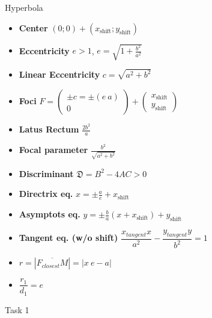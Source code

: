 \documentclass[aspectratio=169]{beamer}
\newcommand{\shf}{\text{shift}}
\begin{document}
\begin{frame}[t]{Hyperbola}
\begin{multicols}{3}
\begin{itemize}
                \item \textbf{Center} $(0;0) + (x_{\shf};y_{\shf})$
                \item \textbf{Eccentricity} $e > 1$, $e = \sqrt{1 + \frac{b^2}{a^2}}$
                \item \textbf{Linear Eccentricity} $c = \sqrt{a^2+b^2}$
                \item \textbf{Foci} $F = \begin{pmatrix} \pm c = \pm (e\ a)\\ 0 \end{pmatrix} + \begin{pmatrix} x_{\shf}\\y_{\shf} \end{pmatrix}$
                \item \textbf{Latus Rectum} $\frac{2b^2}{a}$
                \item \textbf{Focal parameter}  $\frac{b^2}{\sqrt{a^2+b^2}}$
                \item \textbf{Discriminant} $\mathfrak{D} = B^2 - 4AC > 0$
                \item \textbf{Directrix eq.} $x = \pm \frac{a}{e} + x_{\shf}$
                \item \textbf{Asymptots eq.} $y = \pm \frac{b}{a}(x+x_{\shf}) + y_{\shf}$
                \item \textbf{Tangent eq. (w/o shift)} $\dfrac{x_{tangent} x}{a^2}-\dfrac{y_{tangent} y}{b^2}=1$
                \item $r = |\overline{F_{closest}M}|=|x\ e - a|$
                \item $\dfrac{r_1}{d_1}=e$
                \end{itemize}
        \end{multicols}
        \end{frame}

\begin{frame}[t]{Task 1}
    \framesubtitle{}
\end{frame}
\end{document}
